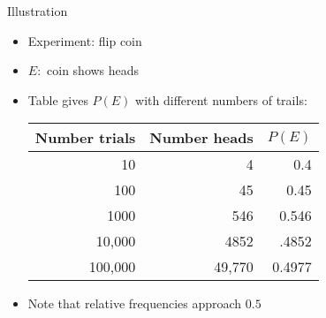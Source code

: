 \documentclass{beamer}
\theoremstyle{definition}
\begin{document}
\begin{frame}{Illustration}
\begin{itemize}
\item Experiment: flip coin
\item $E:$ coin shows heads
\item Table gives $P\left(E\right)$ with different numbers of trails:
\begin{center}\begin{tabular}{rrr}
Number trials&Number heads&$P\left(E\right)$\\\hline
10&4&0.4\\
100&45&0.45\\
1000&546&0.546\\
10,000&4852&.4852\\
100,000&49,770&0.4977
\end{tabular}\end{center}
\item Note that relative frequencies approach $0.5$
\end{itemize}
\end{frame}
\end{document}
